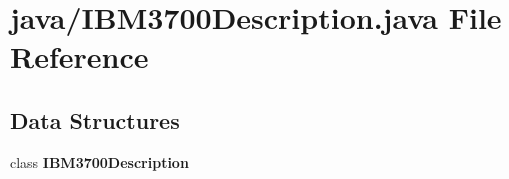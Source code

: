 \section{java/\-I\-B\-M3700\-Description.java File Reference}
\label{IBM3700Description_8java}
\subsection*{Data Structures}
\begin{DoxyCompactItemize}
\item 
class {\bf I\-B\-M3700\-Description}
\end{DoxyCompactItemize}
